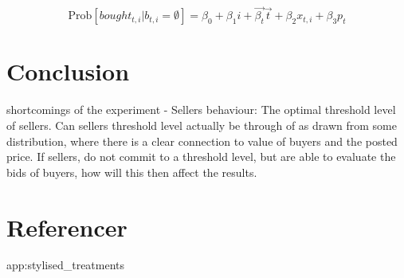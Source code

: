 \documentclass[a4paper,12pt]{article}
\begin{document}
	\[ \mbox{Prob}[bought_{t,i} | b_{t,i} = \emptyset]  = \beta_0 + \beta_1 i + \vec{\beta_t} \vec{t} + \beta_2 x_{t,i} + \beta_3 p_t \]

	
	\section{Conclusion}
			
	shortcomings of the experiment
	- Sellers behaviour: The optimal threshold level of sellers. Can sellers threshold level actually be through of as drawn from some distribution, where there is a clear connection to value of buyers and the posted price. If sellers, do not commit to a threshold level, but are able to evaluate the bids of buyers, how will this then affect the results.
	
			
	\newpage
	\appendix
	
	\begingroup
		\section{Referencer}
		
		\nocite{*}
		\renewcommand{\section}[2]{}%
		\raggedright
		
	\endgroup
	
	\section{Stylised illustration of treatments}
	\label{app:stylised_treatments}
	
\end{document}
